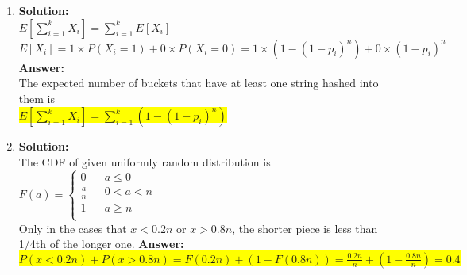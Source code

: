 \documentclass{article}
\newcommand{\myansw}{\textbf{Answer:}\\}
\newcommand{\mysolu}{\textbf{Solution:}\\}
\begin{document}
\begin{enumerate}
	\item
	\mysolu
	${E[\sum\limits_{i = 1}^k X_i]=\sum\limits_{i=1}^k E[X_i]}$\\
	${E[X_i]=1\times P(X_i = 1) + 0 \times P(X_i = 0)=1 \times (1 - (1 - p_i)^n)+ 0 \times (1 - p_i)^n}$\\
	\myansw
	The expected number of buckets that have at least one string hashed into them is\\
	\colorbox{yellow}{${E[\sum\limits_{i = 1}^k X_i]=\sum\limits_{i=1}^k (1-(1-p_i)^n)}$}\\
	\item
	\mysolu
	The CDF of given uniformly random distribution is\\
	$F(a)=\left\lbrace \begin{array}{rcl}
		0 & &{a\leq 0}\\
		\frac{a}{n} & &{0<a<n}\\
		1 & & a\geq n\\
	\end{array} \right.$\\
	Only in the cases that ${x<0.2n}$ or ${x>0.8n}$, the shorter piece is less than 1/4th of the longer one.
	\myansw
	\colorbox{yellow}{${P(x<0.2n)+P(x>0.8n)=F(0.2n)+(1-F(0.8n))=\frac{0.2n}{n}+(1-\frac{0.8n}{n})=0.4}$}\\
	

\end{enumerate}
\end{document}
